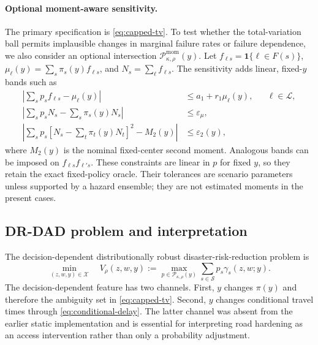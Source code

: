\paragraph{Optional moment-aware sensitivity.}
The primary specification is \eqref{eq:capped-tv}. To test whether the
total-variation ball permits implausible changes in marginal failure rates
or failure dependence, we also consider an optional intersection
\(\mathcal P_{\kappa,\rho}^{\mathrm{mom}}(y)\). Let
\(f_{\ell s}=\mathbf{1}\{\ell\in F(s)\}\),
\(\mu_\ell(y)=\sum_s\pi_s(y)f_{\ell s}\), and
\(N_s=\sum_\ell f_{\ell s}\). The sensitivity adds linear, fixed-\(y\)
bands such as
\begin{align}
\left\lvert\sum_s p_s f_{\ell s}-\mu_\ell(y)\right\rvert
 &\leq a_1+r_1\mu_\ell(y), &&\ell\in\mathcal L, \label{eq:moment-marginal}\\
\left\lvert\sum_s p_sN_s-\sum_s\pi_s(y)N_s\right\rvert
 &\leq\varepsilon_\mu, \label{eq:moment-mean}\\
\left\lvert\sum_s p_s
  \left[N_s-\sum_t\pi_t(y)N_t\right]^2-M_2(y)\right\rvert
 &\leq\varepsilon_2(y), \label{eq:moment-second}
\end{align}
where \(M_2(y)\) is the nominal fixed-center second moment. Analogous bands
can be imposed on \(f_{\ell s}f_{\ell' s}\). These constraints are linear in
\(p\) for fixed \(y\), so they retain the exact fixed-policy oracle. Their
tolerances are scenario parameters unless supported by a hazard ensemble;
they are not estimated moments in the present cases.

\subsection{DR-DAD problem and interpretation}
\label{sec:dad-problem}

The decision-dependent distributionally robust disaster-risk-reduction
problem is
\begin{equation}
 \min_{(z,w,y)\in\mathcal X}
 \quad V_\rho(z,w,y)
 :=
 \max_{p\in\mathcal P_{\kappa,\rho}(y)}
 \sum_{s\in\mathcal S}p_s\gamma_s(z,w;y).
\label{eq:dr-dad}
\end{equation}
The decision-dependent feature has two channels. First, \(y\) changes
\(\pi(y)\) and therefore the ambiguity set in \eqref{eq:capped-tv}. Second,
\(y\) changes conditional travel times through \eqref{eq:conditional-delay}.
The latter channel was absent from the earlier static implementation and is
essential for interpreting road hardening as an access intervention rather
than only a probability adjustment.

